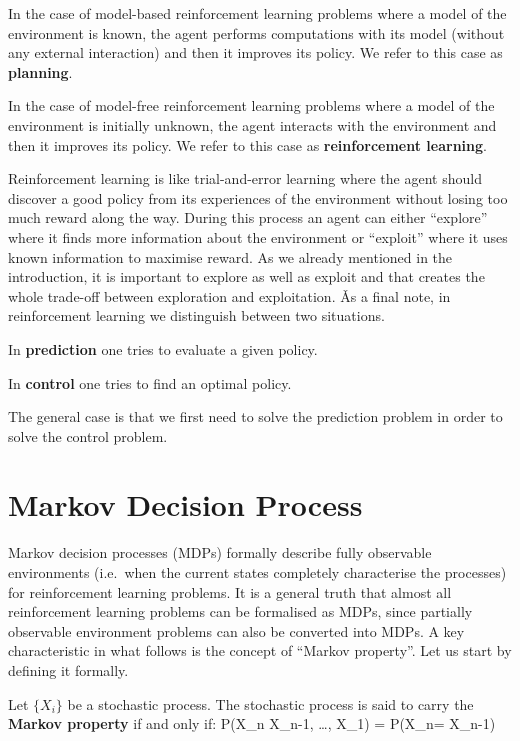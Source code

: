 \bd [Planning]
In the case of model-based reinforcement learning problems where a model of the environment is known, the agent 
performs computations with its model (without any external interaction) and then it improves its policy. We refer to 
this case as \textbf{planning}. 
\ed

In the case of model-free reinforcement learning problems where a model of the environment is initially unknown, the
agent interacts with the environment and then it improves its policy. We refer to this case as \textbf{reinforcement 
learning}. 
\ed

Reinforcement learning is like trial-and-error learning where the agent should discover a good policy from its 
experiences of the environment without losing too much reward along the way. During this process an agent can either 
``explore'' where it finds more information about the environment or ``exploit'' where it uses known information to 
maximise reward. As we already mentioned in the introduction, it is important to explore as well as exploit and that
creates the whole trade-off between exploration and exploitation. \v

As a final note, in reinforcement learning we distinguish between two situations.

\bd[Prediction]
In \textbf{prediction} one tries to evaluate a given policy.
\ed

\bd[Control]
In \textbf{control} one tries to find an optimal policy.
\ed

The general case is that we first need to solve the prediction problem in order to solve the control problem.

\section{Markov Decision Process}

Markov decision processes (MDPs) formally describe fully observable environments (i.e.\ when the current states
completely characterise the processes) for reinforcement learning problems. It is a general truth that almost all 
reinforcement learning problems can be formalised as MDPs, since partially observable environment problems can also 
be converted into MDPs. A key characteristic in what follows is the concept of ``Markov property''. Let us start by 
defining it formally.

Let $\{X_i\}$ be a stochastic process. The stochastic process is said to carry the \textbf{Markov property} if and 
only if:
\bse
P(X_{n} \mid X_{n-1}, \dots, X_{1}) = P(X_{n}= \mid X_{n-1})
\ese
\ed


